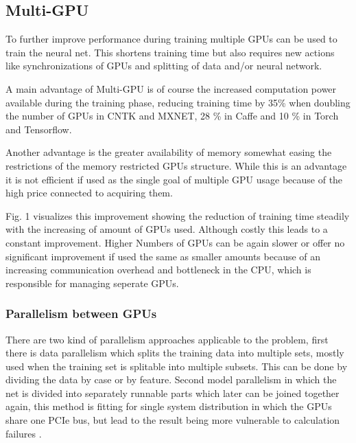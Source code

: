 \documentclass[conference]{IEEEtran}
\begin{document}
\subsection{Multi-GPU}
To further improve performance during training multiple GPUs can be used to train the neural net. This shortens training time but also requires new actions like synchronizations of GPUs and splitting of data and/or neural network.

A main advantage of Multi-GPU is of course the increased computation power available during the training phase, reducing training time by 35\% when doubling the number of GPUs in CNTK and MXNET, 28 \% in Caffe and 10 \% in  Torch and Tensorflow\cite{shi2016benchmarking}.

Another advantage is the greater availability of memory somewhat easing the restrictions of the memory restricted GPUs structure. While this is an advantage it is not efficient if used as the single goal of multiple GPU usage because of the high price connected to acquiring them.

Fig. 1 visualizes this improvement showing the reduction of training time steadily with the increasing of amount of GPUs used. Although costly this leads to a constant improvement. Higher Numbers of GPUs can be again slower or offer no significant improvement if used the same as smaller amounts because of an increasing communication overhead and bottleneck in the CPU, which is responsible for managing seperate GPUs.

\subsubsection{Parallelism between GPUs}
There are two kind of parallelism approaches applicable to the problem, first there is data parallelism which splits the training data into multiple sets, mostly used when the training set is splitable into multiple subsets. This can be done by dividing the data by case or by feature. Second model parallelism in which the net is divided into separately runnable parts which later can be joined together again, this method is fitting for single system distribution in which the GPUs share one PCIe bus, but lead to the result being more vulnerable to calculation failures \cite{sastre2017scalability}.
\end{document}
